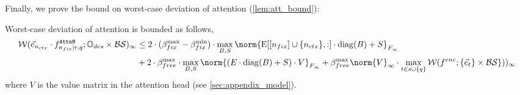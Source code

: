 \newcommand{\free}{\text{free}}
\newcommand{\fix}{\text{fix}}
Finally, we prove the bound on worst-case deviation of attention (\cref{lem:att_bound}):
\begin{lemma}
	Worst-case deviation of attention is bounded as follows,
	\begin{align*}
		\WD(\vecNctx \cdot f^{\attnH}_{\ndes \mid r, q} ; \InpSpace \times \blowupSet \shiftSet)_\infty
	     &\leq
	     2 \cdot (\ssMaxRB - \ssMinRB) \cdot \max_{B, S}\norm{\Embed[[\nfix] \cup \{\nctx\}, :] \cdot \diag(B) + S}_{\frobInf} \\
		&+ 2 \cdot \ssMaxFB \cdot \max_{B, S} \norm{(E \cdot \diag(B) + S) \cdot V}_{\frobInf}
        + \ssMaxFB  \norm{V}_\infty \cdot \max_{t \in s \cup \{q\}} \WD(\fenc; \{\vece_t\} \times \blowupSet \shiftSet\}))_\infty
	\end{align*}
        where $V$ is the value matrix in the attention head (see \cref{sec:appendix_model}).
\end{lemma}
